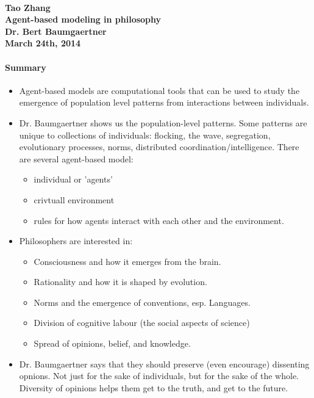 \documentclass[12pt]{article}
\begin{document}
\paragraph{Tao Zhang\\Agent-based modeling in philosophy\\Dr. Bert Baumgaertner\\March 24th, 2014}

\paragraph{Summary}

\begin{itemize}
\item Agent-based models are computational tools that can be used to study the emergence of population level patterns from interactions between individuals.
\item Dr. Baumgaertner shows us the population-level patterns. Some patterns are unique to collections of individuals: flocking, the wave, segregation, evolutionary processes, norms, distributed coordination/intelligence. There are several agent-based model: 
	\begin{itemize}
	\item individual or 'agents'
	\item crivtuall environment
	\item rules for how agents interact with each other and the environment.
	\end{itemize}		
\item Philosophers are interested in:
	\begin{itemize}
	\item Consciousness and how it emerges from the brain.
	\item Rationality and how it is shaped by evolution.
	\item Norms and the emergence of conventions, esp. Languages.
	\item Division of cognitive labour (the social aspects of science)
	\item Spread of opinions, belief, and knowledge.
	\end{itemize}
\item Dr. Baumgaertner says that they should preserve (even encourage) dissenting opnions. Not just for the sake of individuals, but for the sake of the whole. Diversity of opinions helps them get to the truth, and get to the future.
\end{itemize}
\end{document}
